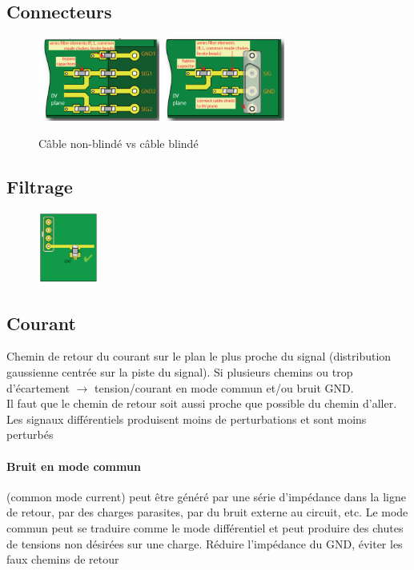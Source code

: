 \documentclass[resume]{subfiles}
\begin{document}
\begin{multicols}{3}
\subsection{Connecteurs}
\begin{figure}[H]
\centering
\includegraphics[width=4.00cm]{img_0.png}
\includegraphics[width=4.00cm]{img_1.png}
\caption{Câble non-blindé vs câble blindé}
\end{figure}
\subsection{Filtrage}
\begin{figure}[H]
\centering
\includegraphics[width=2.00cm]{img_2.png}
\end{figure}
\subsection{Courant}
Chemin de retour du courant sur le plan le plus proche du signal (distribution gaussienne centrée sur la piste du signal). Si plusieurs chemins ou trop d'écartement $\longrightarrow$ tension/courant en mode commun et/ou bruit GND.\\
Il faut que le chemin de retour soit aussi proche que possible du chemin d'aller.
Les signaux différentiels produisent moins de perturbations et sont moins perturbés
\paragraph{Bruit en mode commun} (common mode current) peut être généré par une série d'impédance dans la ligne de retour, par des charges parasites, par du bruit externe au circuit, etc. Le mode commun peut se traduire comme le mode différentiel et peut produire des chutes de tensions non désirées sur une charge. Réduire l'impédance du GND, éviter les faux chemins de retour

\end{multicols}
\end{document}
